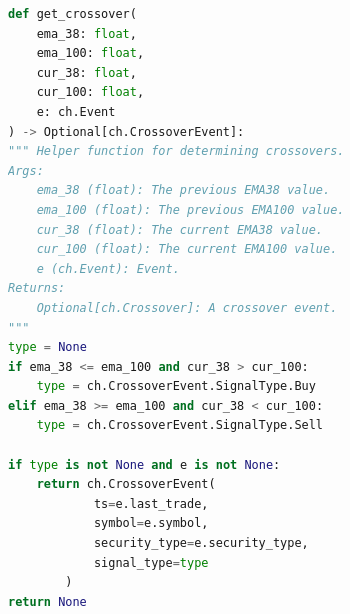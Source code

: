 \begin{minipage}{0.9\linewidth}
\begin{lstlisting}[caption={The computation for Query 2 - Breakout Patterns of EMA38 and EMA100}, label={lst:query2},language=Python]
def get_crossover(
    ema_38: float,
    ema_100: float,
    cur_38: float,
    cur_100: float,
    e: ch.Event
) -> Optional[ch.CrossoverEvent]:
""" Helper function for determining crossovers.
Args:
    ema_38 (float): The previous EMA38 value.
    ema_100 (float): The previous EMA100 value.
    cur_38 (float): The current EMA38 value.
    cur_100 (float): The current EMA100 value.
    e (ch.Event): Event.
Returns:
    Optional[ch.Crossover]: A crossover event.
"""
type = None
if ema_38 <= ema_100 and cur_38 > cur_100:
    type = ch.CrossoverEvent.SignalType.Buy
elif ema_38 >= ema_100 and cur_38 < cur_100:
    type = ch.CrossoverEvent.SignalType.Sell

if type is not None and e is not None:
    return ch.CrossoverEvent(
            ts=e.last_trade,
            symbol=e.symbol,
            security_type=e.security_type,
            signal_type=type
        )    
return None
\end{lstlisting}
\end{minipage}







        
